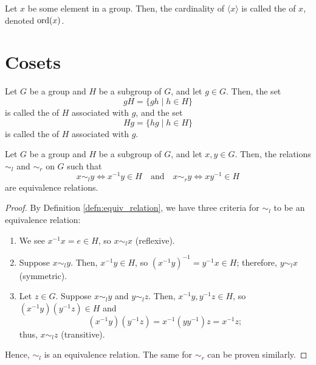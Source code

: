 \begin{defn}
Let $ x $ be some element in a group. Then, the cardinality of $ \langle x\rangle $ is called the  of $ x $, denoted $ \operatorname{ord}(x) $.
\end{defn}

\section{Cosets}

\begin{defn}
Let $ G $ be a group and $ H $ be a subgroup of $ G $, and let $ g\in G $. Then, the set
\begin{equation*}
    gH=\{gh\mid h\in H\}
\end{equation*}
is called the  of $ H $ associated with $ g $, and the set
\begin{equation*}
    Hg=\{hg\mid h\in H\}
\end{equation*}
is called the  of $ H $ associated with $ g $.
\end{defn}

\begin{thm}\label{thm:coset_relations}
Let $ G $ be a group and $ H $ be a subgroup of $ G $, and let $ x,y\in G $. Then, the relations $ \sim_l $ and $ \sim_r $ on $ G $ such that
\begin{equation*}
    x\sim_l y\iff x^{-1}y\in H \quad\text{and}\quad x\sim_r y\iff xy^{-1}\in H
\end{equation*}
are equivalence relations.
\end{thm}
\begin{proof}
By Definition \ref{defn:equiv_relation}, we have three criteria for $ \sim_l $ to be an equivalence relation:
\begin{enumerate}
    \item We see $ x^{-1}x=e\in H $, so $ x\sim_l x $ (reflexive).
    \item Suppose $ x\sim_l y $. Then, $ x^{-1}y\in H $, so $ (x^{-1}y)^{-1}=y^{-1}x\in H $; therefore, $ y\sim_l x $ (symmetric).
    \item Let $ z\in G $. Suppose $ x\sim_l y $ and $ y\sim_l z $. Then, $ x^{-1}y,y^{-1}z\in H $, so $ (x^{-1}y)(y^{-1}z)\in H $ and
    \begin{equation*}
        (x^{-1}y)(y^{-1}z)=x^{-1}(yy^{-1})z=x^{-1}z;
    \end{equation*}
    thus, $ x\sim_l z $ (transitive).
\end{enumerate}
Hence, $ \sim_l $ is an equivalence relation. The same for $ \sim_r $ can be proven similarly.
\end{proof}

